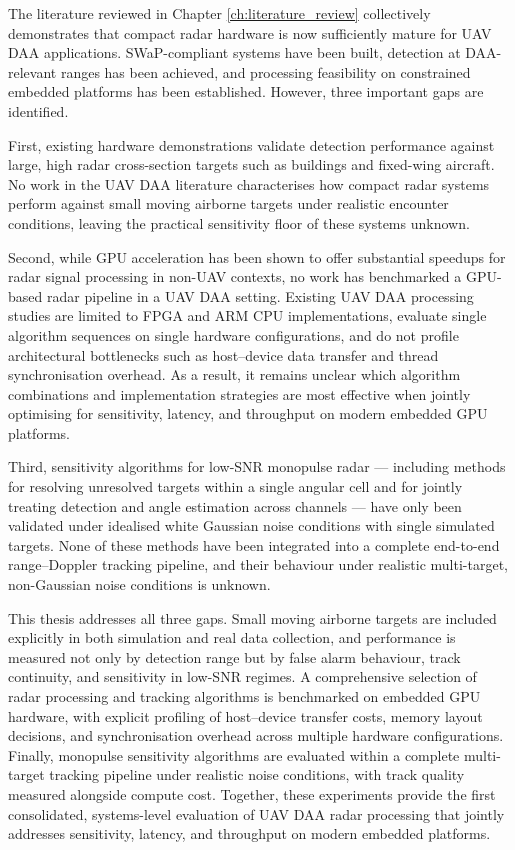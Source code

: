 The literature reviewed in Chapter \ref{ch:literature_review} collectively demonstrates that compact radar hardware is now sufficiently mature for UAV DAA applications. SWaP-compliant systems have been built, detection at DAA-relevant ranges has been achieved, and processing feasibility on constrained embedded platforms has been established. However, three important gaps are identified.

First, existing hardware demonstrations validate detection performance against 
large, high radar cross-section targets such as buildings and fixed-wing aircraft. 
No work in the UAV DAA literature characterises how compact radar systems perform 
against small moving airborne targets under realistic encounter conditions, leaving 
the practical sensitivity floor of these systems unknown.

Second, while GPU acceleration has been shown to offer substantial speedups for 
radar signal processing in non-UAV contexts, no work has benchmarked a 
GPU-based radar pipeline in a UAV DAA setting. Existing UAV DAA processing 
studies are limited to FPGA and ARM CPU implementations, evaluate single 
algorithm sequences on single hardware configurations, and do not profile 
architectural bottlenecks such as host--device data transfer and thread 
synchronisation overhead. As a result, it remains unclear which algorithm 
combinations and implementation strategies are most effective when jointly 
optimising for sensitivity, latency, and throughput on modern embedded GPU 
platforms.

Third, sensitivity algorithms for low-SNR monopulse radar --- including methods 
for resolving unresolved targets within a single angular cell and for jointly 
treating detection and angle estimation across channels --- have only been 
validated under idealised white Gaussian noise conditions with single simulated 
targets. None of these methods have been integrated into a complete end-to-end 
range--Doppler tracking pipeline, and their behaviour under realistic 
multi-target, non-Gaussian noise conditions is unknown.

This thesis addresses all three gaps. Small moving airborne targets are 
included explicitly in both simulation and real data collection, and performance 
is measured not only by detection range but by false alarm behaviour, track 
continuity, and sensitivity in low-SNR regimes. A comprehensive selection of 
radar processing and tracking algorithms is benchmarked on embedded GPU 
hardware, with explicit profiling of host--device transfer costs, memory layout 
decisions, and synchronisation overhead across multiple hardware configurations. 
Finally, monopulse sensitivity algorithms are evaluated within a complete 
multi-target tracking pipeline under realistic noise conditions, with track 
quality measured alongside compute cost. Together, these experiments provide 
the first consolidated, systems-level evaluation of UAV DAA radar processing 
that jointly addresses sensitivity, latency, and throughput on modern embedded 
platforms.
